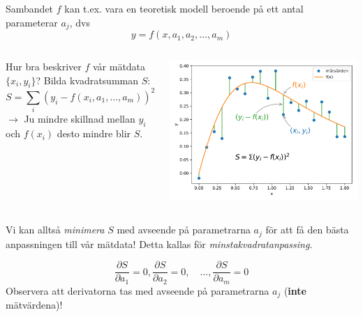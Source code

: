 \documentclass[9pt]{beamer}
\begin{document}
    \begin{frame}
        Sambandet $f$ kan t.ex. vara en teoretisk modell beroende på ett antal parameterar $a_j$, dvs
        \begin{equation*}
            y = f(x,a_1, a_2, \ldots, a_m)
        \end{equation*}

        \vfill

        \begin{columns}[C]
            Hur bra beskriver $f$ vår mätdata $\{x_i,y_i\}$? Bilda kvadratsumman $S$:
            \begin{equation*}
                S = \sum_i\left(y_i - f(x_i,a_1,\ldots,a_m)\right)^2
            \end{equation*}
            $\rightarrow$ Ju mindre skillnad mellan $y_i$ och $f(x_i)$ desto mindre blir $S$.

            \includegraphics[width=\textwidth]{S.pdf}
        \end{columns}

        \vfill
        Vi kan alltså \emph{minimera} $S$ med avseende på parametrarna $a_j$ för
        att få den bästa anpassningen till vår mätdata! Detta kallas för
        \emph{minstakvadratanpassing}.

        \begin{equation*}
            \frac{\partial S}{\partial a_1} = 0,
            \frac{\partial S}{\partial a_2} = 0,\quad\ldots,
            \frac{\partial S}{\partial a_m} = 0
        \end{equation*}
        Observera att derivatorna tas med avseende på parametrarna $a_j$ (\textbf{inte} mätvärdena)!
    \end{frame}
\end{document}
